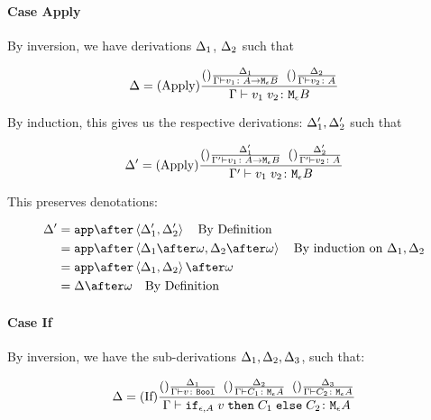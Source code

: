 {    \paragraph{Case Apply}
        By inversion, we have derivations $\Delta_1$, $\Delta_2$ such that

        \begin{equation}
            \Delta = 
            (\text{Apply}) \frac{
                (\text{}) \frac{\Delta_1}{\Gamma \vdash v_1 \colon A \rightarrow \texttt{M}_{\epsilon}{B}}
                \;\;
                (\text{}) \frac{\Delta_2}{\Gamma \vdash v_2 \colon A}
            }{
                \Gamma \vdash v_1\; v_2 \colon \texttt{M}_{\epsilon}{B}
            }
        \end{equation}

        By induction, this gives us the respective derivations: $\Delta_1',\Delta_2'$ such that

        
        \begin{equation}
            \Delta' = 
            (\text{Apply}) \frac{
                (\text{}) \frac{\Delta_1'}{\Gamma' \vdash v_1 \colon A \rightarrow \texttt{M}_{\epsilon}{B}}
                \;\;
                (\text{}) \frac{\Delta_2'}{\Gamma' \vdash v_2 \colon A}
            }{
                \Gamma' \vdash v_1\; v_2 \colon \texttt{M}_{\epsilon}{B}
            }
        \end{equation}

        This preserves denotations:

        \begin{align}
            \D' &= \app\after\pr{\D_1'}{\D_2'} \qt{By Definition}\\
            &= \app\after\pr{\D_1\after\w}{\D_2\after\w} \qt{By induction on $\D_1, \D_2$}\\
            &= \app\after\pr{\D_1}{\D_2}\after\w\\
            &= \D\after\w\qt{By Definition}
        \end{align}
    \paragraph{Case If}
    By inversion, we have the sub-derivations $\Delta_1,\Delta_2,\Delta_3$, such that:


    \begin{equation}
        \Delta = (\text{If}) \frac{
            (\text{}) \frac{\Delta_1}{\Gamma \vdash v \colon \texttt{Bool}}
            \;\;
            (\text{}) \frac{\Delta_2}{\Gamma \vdash C_1 \colon \texttt{M}_{\epsilon}{A}}
            \;\;
            (\text{}) \frac{\Delta_3}{\Gamma \vdash C_2 \colon \texttt{M}_{\epsilon}{A}}
        }{
            \Gamma \vdash \texttt{if}_{\epsilon, A}\; v\; \texttt{then}\; C_1 \;\texttt{else} \; C_2 \colon \texttt{M}_{\epsilon}{A}
        }
    \end{equation}

}
